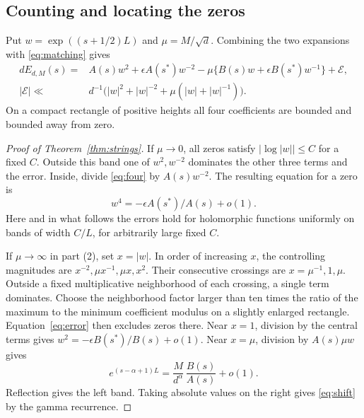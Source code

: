 \subsection{Counting and locating the zeros}
Put $w=\exp((s+1/2)L)$ and $\mu=M/\sqrt d$. Combining the two expansions
with \eqref{eq:matching} gives
\begin{align}
 dE_{d,M}(s)={}&A(s)w^2+\epsilon A(s^*)w^{-2}
        -\mu\{B(s)w+\epsilon B(s^*)w^{-1}\}+\mathcal E,\label{eq:four}\\
 |\mathcal E|\ll{}&d^{-1}
 \big(|w|^2+|w|^{-2}+\mu(|w|+|w|^{-1})\big).
 \label{eq:error}
\end{align}
On a compact rectangle of positive heights all four coefficients
are bounded and bounded away from zero.

\begin{proof}[Proof of Theorem~\ref{thm:strings}]
If $\mu\to0$, all zeros satisfy $|\log|w||\le C$ for a fixed
$C$. Outside this band one of $w^2,w^{-2}$ dominates the other three
terms and the error. Inside, divide \eqref{eq:four} by $A(s)w^{-2}$.
The resulting equation for a zero is
\[
 w^4=-\epsilon A(s^*)/A(s)+o(1).
\]
Here and in what follows the errors hold for holomorphic functions
uniformly on bands of width $C/L$, for arbitrarily large fixed $C$.

If $\mu\to\infty$ in part (2), set $x=|w|$. In order of increasing
$x$, the controlling magnitudes are
$x^{-2},\mu x^{-1},\mu x,x^2$.
Their consecutive crossings are $x=\mu^{-1},1,\mu$.
Outside a fixed multiplicative neighborhood of each crossing, a
single term dominates. Choose the neighborhood factor larger than
ten times the ratio of the maximum to the minimum coefficient
modulus on a slightly enlarged rectangle. Equation~\eqref{eq:error}
then excludes zeros there. Near $x=1$, division by the central terms
gives $w^2=-\epsilon B(s^*)/B(s)+o(1)$. Near $x=\mu$, division
by $A(s)\mu w$ gives
\[
  e^{(s-\alpha+1)L}
    = \frac{M}{d^\alpha}\,\frac{B(s)}{A(s)}+o(1).
\]
Reflection gives the left band. Taking absolute values on the right
gives \eqref{eq:shift} by the gamma recurrence.


\end{proof}
